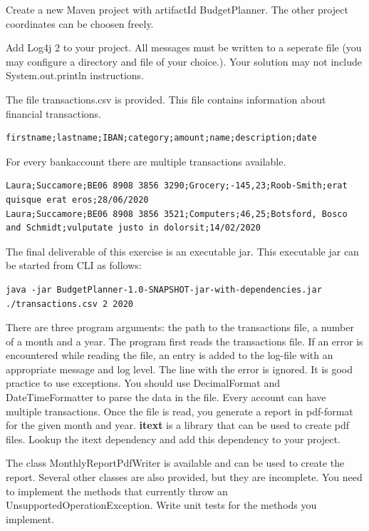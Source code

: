 \begin{oefening}
Create a new Maven project with artifactId BudgetPlanner.  The other project coordinates can be choosen freely.   

Add Log4j 2 to your project. All messages must be written to a seperate file (you may configure a directory and file of your choice.). Your solution may not include System.out.println instructions.
    
The file transactions.csv is provided. This file contains information about financial transactions. 
        
\begin{lstlisting}[frame=single]
firstname;lastname;IBAN;category;amount;name;description;date
\end{lstlisting}
    
For every bankaccount there are multiple transactions available.

\begin{lstlisting}[frame=single]
Laura;Succamore;BE06 8908 3856 3290;Grocery;-145,23;Roob-Smith;erat quisque erat eros;28/06/2020
Laura;Succamore;BE06 8908 3856 3521;Computers;46,25;Botsford, Bosco and Schmidt;vulputate justo in dolorsit;14/02/2020
\end{lstlisting}

The final deliverable of this exercise is an executable jar. This executable jar can be started from CLI as follows:

\begin{lstlisting}
java -jar BudgetPlanner-1.0-SNAPSHOT-jar-with-dependencies.jar ./transactions.csv 2 2020
\end{lstlisting}

There are three program arguments: the path to the transactions file, a number of a month and a year. 
The program first reads the transactions file. If an error is encountered while reading the file,  an entry is added to the log-file with an appropriate message and log level. The line with the error is ignored.
It is good practice to use exceptions. You should use DecimalFormat and DateTimeFormatter to parse the data in the file. Every account can have multiple transactions. Once the file is read, you generate a report in pdf-format for the given month and year. \textbf{itext} is a library that can be used to create pdf files.  Lookup the itext dependency and add this dependency to your project. 

The class MonthlyReportPdfWriter is available and can be used to create the report. 
Several other classes are also provided, but they are incomplete. You need to implement the methods that currently throw an UnsupportedOperationException. Write unit tests for the methods you implement. 


\end{oefening}

